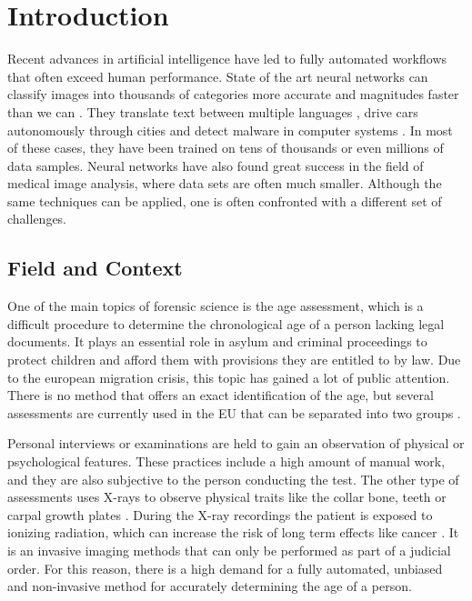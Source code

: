 \section{Introduction}

Recent advances in artificial intelligence have led to fully automated workflows that often exceed human performance. State of the art neural networks can classify images into thousands of categories more accurate and magnitudes faster than we can \cite{He2015a}. They translate text between multiple languages \cite{Wu2016}, drive cars autonomously through cities \cite{Bojarski2017} and detect malware in computer systems \cite{Saxe2015}. In most of these cases, they have been trained on tens of thousands or even millions of data samples. Neural networks have also found great success in the field of medical image analysis, where data sets are often much smaller. Although the same techniques can be applied, one is often confronted with a different set of challenges.

\subsection{Field and Context}

One of the main topics of forensic science is the age assessment, which is a difficult procedure to determine the chronological age of a person lacking legal documents. It plays an essential role in asylum and criminal proceedings to protect children and afford them with provisions they are entitled to by law. Due to the european migration crisis, this topic has gained a lot of public attention. There is no method that offers an exact identification of the age, but several assessments are currently used in the EU that can be separated into two groups \cite{EuropeanAsylumSupportOffice2013}.

Personal interviews or examinations are held to gain an observation of physical or psychological features. These practices include a high amount of manual work, and they are also subjective to the person conducting the test. The other type of assessments uses X-rays to observe physical traits like the collar bone, teeth or carpal growth plates \cite{EuropeanAsylumSupportOffice2013}. During the X-ray recordings the patient is exposed to ionizing radiation, which can increase the risk of long term effects like cancer \cite{WorldHealthOrganization2016}. It is an invasive imaging methods that can only be performed as part of a judicial order. For this reason, there is a high demand for a fully automated, unbiased and non-invasive method for accurately determining the age of a person.

